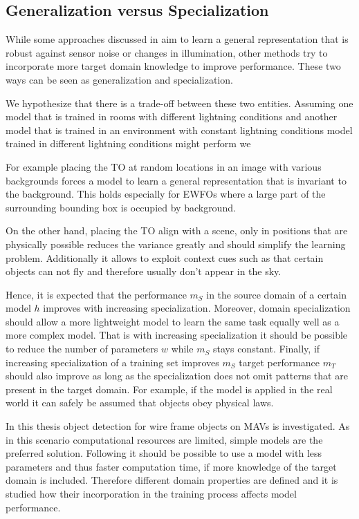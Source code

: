 \subsection{Generalization versus Specialization}
\label{sec:training:genvsspc}

While some approaches discussed in  aim to learn a general representation that is robust against sensor noise or changes in illumination, other methods try to incorporate more target domain knowledge to improve performance. These two ways can be seen as generalization and specialization.

We hypothesize that there is a trade-off between these two entities. Assuming one model that is trained in rooms with different lightning conditions and another model that is trained in an environment with constant lightning conditions model trained in different lightning conditions might perform we

For example placing the \ac{TO} at random locations in an image with various backgrounds forces a model to learn a general representation that is invariant to the background. This holds especially for \acp{EWFO} where a large part of the surrounding bounding box is occupied by background.

On the other hand, placing the \ac{TO} align with a scene, only in positions that are physically possible reduces the variance greatly and should simplify the learning problem. Additionally it allows to exploit context cues such as that certain objects can not fly and therefore usually don't appear in the sky.

Hence, it is expected that the performance $m_{S}$ in the source domain  of a certain model $h$ improves with increasing specialization. Moreover, domain specialization should allow a more lightweight model to learn the same task equally well as a more complex model. That is with increasing specialization it should be possible to reduce the number of parameters $w$ while $m_{S}$ stays constant. Finally, if increasing specialization of a training set improves $m_{S}$ target performance $m_T$ should also improve as long as the specialization does not omit patterns that are present in the target domain. For example, if the model is applied in the real world it can safely be assumed that objects obey physical laws.

In this thesis object detection for wire frame objects on \acp{MAV} is investigated. As in this scenario computational resources are limited, simple models are the preferred solution. Following  it should be possible to use a model with less parameters and thus faster computation time, if more knowledge of the target domain is included. Therefore different domain properties are defined and it is studied how their incorporation in the training process affects model performance.

